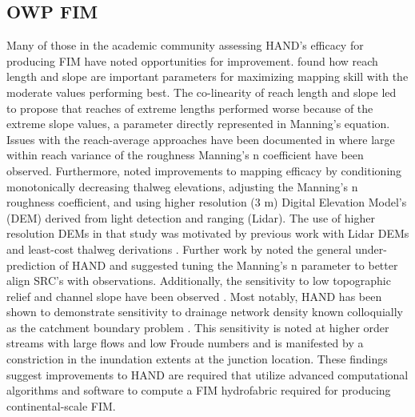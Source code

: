 \documentclass[draft]{dependencies/agujournal2019}
\begin{document}
\subsection{OWP FIM}
%
Many of those in the academic community assessing HAND's efficacy for producing FIM have noted opportunities for improvement. 
 found how reach length and slope are important parameters for maximizing mapping skill with the moderate values performing best. 
The co-linearity of reach length and slope led  to propose that reaches of extreme lengths performed worse because of the extreme slope values, a parameter directly represented in Manning's equation. 
Issues with the reach-average approaches have been documented in  where large within reach variance of the roughness Manning's n coefficient have been observed.
Furthermore,  noted improvements to mapping efficacy by conditioning monotonically decreasing thalweg elevations, adjusting the Manning's n roughness coefficient, and using higher resolution (3 m) Digital Elevation Model's (DEM) derived from light detection and ranging (Lidar).
The use of higher resolution DEMs in that study was motivated by previous work with Lidar DEMs and least-cost thalweg derivations \cite{zheng2018geoflood}.
Further work by  noted the general under-prediction of HAND and suggested tuning the Manning's n parameter to better align SRC's with observations. 
Additionally, the sensitivity to low topographic relief and channel slope have been observed \cite{johnson2019integrated,godbout2019error}. 
Most notably, HAND has been shown to demonstrate sensitivity to drainage network density known colloquially as the catchment boundary problem \cite{zhang2018comparative,mcgehee2016modified,li2020evaluation,nobre2016hand}.
This sensitivity is noted at higher order streams with large flows and low Froude numbers and is manifested by a constriction in the inundation extents at the junction location.
These findings suggest improvements to HAND are required that utilize advanced computational algorithms and software to compute a FIM hydrofabric required for producing continental-scale FIM.
\end{document}

